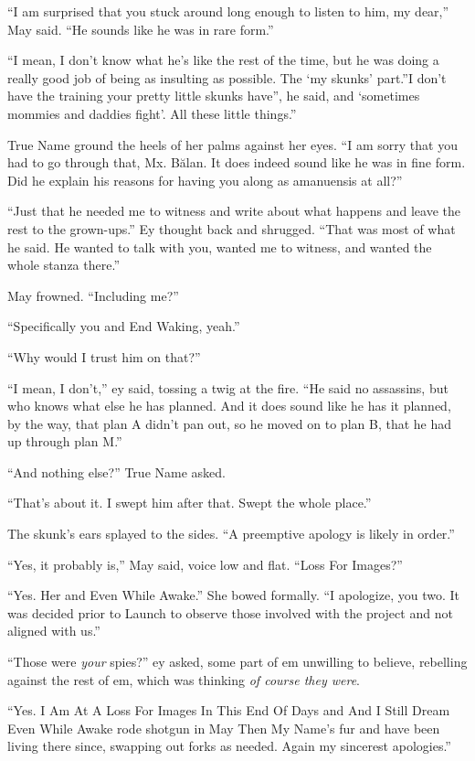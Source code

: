 ``I am surprised that you stuck around long enough to listen to him, my dear,'' May said. ``He sounds like he was in rare form.''

``I mean, I don't know what he's like the rest of the time, but he was doing a really good job of being as insulting as possible. The `my skunks' part.''I don't have the training your pretty little skunks have'', he said, and `sometimes mommies and daddies fight'. All these little things.''

True Name ground the heels of her palms against her eyes. ``I am sorry that you had to go through that, Mx. Bălan. It does indeed sound like he was in fine form. Did he explain his reasons for having you along as amanuensis at all?''

``Just that he needed me to witness and write about what happens and leave the rest to the grown-ups.'' Ey thought back and shrugged. ``That was most of what he said. He wanted to talk with you, wanted me to witness, and wanted the whole stanza there.''

May frowned. ``Including me?''

``Specifically you and End Waking, yeah.''

``Why would I trust him on that?''

``I mean, I don't,'' ey said, tossing a twig at the fire. ``He said no assassins, but who knows what else he has planned. And it does sound like he has it planned, by the way, that plan A didn't pan out, so he moved on to plan B, that he had up through plan M.''

``And nothing else?'' True Name asked.

``That's about it. I swept him after that. Swept the whole place.''

The skunk's ears splayed to the sides. ``A preemptive apology is likely in order.''

``Yes, it probably is,'' May said, voice low and flat. ``Loss For Images?''

``Yes. Her and Even While Awake.'' She bowed formally. ``I apologize, you two. It was decided prior to Launch to observe those involved with the project and not aligned with us.''

``Those were \emph{your} spies?'' ey asked, some part of em unwilling to believe, rebelling against the rest of em, which was thinking \emph{of course they were}.

``Yes. I Am At A Loss For Images In This End Of Days and And I Still Dream Even While Awake rode shotgun in May Then My Name's fur and have been living there since, swapping out forks as needed. Again my sincerest apologies.''

